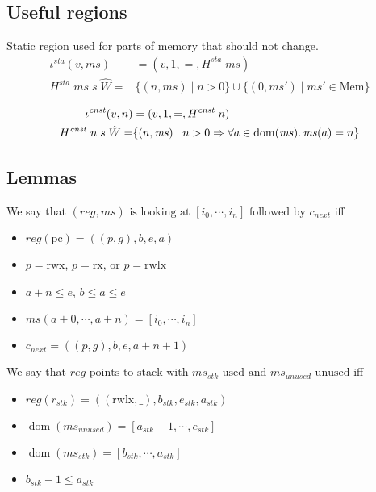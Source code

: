 \documentclass[a4paper]{article}
\newcommand{\union}{\mathbin{\cup}}
\DeclareMathOperator{\dom}{dom}
\newcommand{\var}[1]{\mathit{#1}}
\newcommand{\hs}{\var{ms}}
\newcommand{\ms}{\hs}
\newcommand{\pcreg}{\mathrm{pc}}
\newcommand{\reg}{\var{reg}}
\newcommand{\stk}{\var{stk}}
\newcommand{\sta}{\var{sta}}
\newcommand{\cnst}{\var{cnst}}
\newcommand{\plaindom}[1]{\mathrm{#1}}
\newcommand{\Heaps}{\plaindom{Mem}}
\newcommand{\Mems}{\Heaps}
\newcommand{\npair}[2][n]{\left(#1,#2 \right)}
\newcommand{\plainperm}[1]{\mathrm{#1}}
\newcommand{\exec}{\plainperm{rx}}
\newcommand{\rwx}{\plainperm{rwx}}
\newcommand{\rwlx}{\plainperm{rwlx}}
\begin{document}
\subsection{Useful regions}
Static region used for parts of memory that should not change.
\begin{align*}
  \iota^\sta (v,\ms) &= (v,1,=,H^\sta\;\ms)\\
  H^\sta \; \ms \; s \; \hat{W} = & \{\npair{\ms} \mid n > 0 \} \union \{\npair[0]{\ms'} \mid \ms' \in \Mems \}
\end{align*}

\begin{align*}
  \iota^\cnst (v,n) &= (v,1,=,H^\cnst\;n)\\
  H^\cnst \; n \; s \; \hat{W} = & \{\npair{\ms} \mid n > 0 \Rightarrow \forall a \in \dom(\ms)\ldotp \ms(a) = n \}
\end{align*}

\subsection{Lemmas}


\begin{definition}
  We say that $(\reg,\ms) \text{ is looking at } [i_0,\cdots,i_n] \text{ followed by } c_{\mathit{next}}$ 
  iff
  \begin{itemize}
  \item $\reg(\pcreg) = ((p,g),b,e,a)$
  \item $p = \rwx$, $p = \exec$, or $p = \rwlx$
  \item $a+n\leq e$, $b\leq a\leq e$
  \item $\ms(a+0,\cdots,a+n) = [i_0,\cdots,i_n]$
  \item $c_{\mathit{next}} = ((p,g),b,e,a+n+1)$
  \end{itemize}
\end{definition}

\begin{definition}
  We say that $\reg \text{ points to stack with $\ms_\stk$ used and $\ms_{\mathit{unused}}$ unused}$
  iff
  \begin{itemize}
  \item $\reg(r_\stk) =((\rwlx,\_),b_\stk,e_\stk,a_\stk)$
  \item $\dom(\ms_{\mathit{unused}}) = [a_\stk+1,\cdots,e_\stk]$
  \item $\dom(\ms_\stk) = [b_\stk,\cdots,a_\stk]$
  \item $b_\stk - 1\leq a_\stk$
  \end{itemize}
\end{definition}
\end{document}
